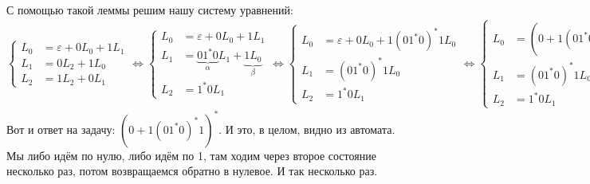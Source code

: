 \documentclass{article}
\begin{document}
\begin{itemize}
\begin{Proof}
        \end{Proof}
        \begin{Comment}
            С помощью такой леммы решим нашу систему уравнений:
            \[
            \left\{\begin{aligned}
                L_0&=\varepsilon+0L_0+1L_1\\
                L_1&=0L_2+1L_0\\
                L_2&=1L_2+0L_1
            \end{aligned}\right.\Leftrightarrow
            \left\{\begin{aligned}
                L_0&=\varepsilon+0L_0+1L_1\\
                L_1&=\underbrace{01^*0}_\alpha L_1+\underbrace{1L_0}_\beta\\
                L_2&=1^*0L_1
            \end{aligned}\right.\Leftrightarrow
            \left\{\begin{aligned}
                L_0&=\varepsilon+0L_0+1(01^*0)^*1L_0\\
                L_1&=(01^*0)^*1L_0\\
                L_2&=1^*0L_1
            \end{aligned}\right.\Leftrightarrow
            \left\{\begin{aligned}
                L_0&=(0+1(01^*0)^*1)L_0+\varepsilon\\
                L_1&=(01^*0)^*1L_0\\
                L_2&=1^*0L_1
            \end{aligned}\right.\Leftrightarrow
            \left\{\begin{aligned}
                L_0&=(0+1(01^*0)^*1)^*\\
                L_1&=(01^*0)^*1L_0\\
                L_2&=1^*0L_1
            \end{aligned}\right.
            \]
            Вот и ответ на задачу: $(0+1(01^*0)^*1)^*$. И это, в целом, видно из автомата. Мы либо идём по нулю, либо идём по 1, там ходим через второе состояние несколько раз, потом возвращаемся обратно в нулевое. И так несколько раз.
        \end{Comment}
    \end{itemize}
\end{document}
